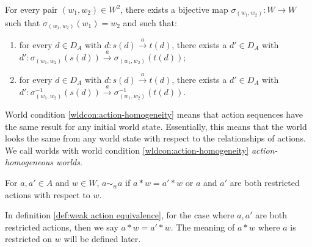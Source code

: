 \begin{world_condition}\label{wldcon:action-homogeneity}
	For every pair $(w_{1}, w_{2}) \in W^{2}$, there exists a bijective map $\sigma_{(w_{1},w_{2})}: W \to W$ such that $\sigma_{(w_{1},w_{2})}(w_{1})=w_{2}$ and such that:

	\begin{enumerate}
		\item for every $d \in D_{A}$ with $d: s(d) \xrightarrow{a} t(d)$, there exists a $d' \in D_{A}$ with $d': \sigma_{(w_{1}, w_{2})}(s(d)) \xrightarrow{a} \sigma_{(w_{1}, w_{2})}(t(d))$;

		\item for every $d \in D_{A}$ with $d: s(d) \xrightarrow{a} t(d)$, there exists a $d' \in D_{A}$ with $d': \sigma^{-1}_{(w_{1}, w_{2})}(s(d)) \xrightarrow{a} \sigma^{-1}_{(w_{1}, w_{2})}(t(d))$.
	\end{enumerate}
\end{world_condition}

World condition \ref{wldcon:action-homogeneity} means that action sequences have the same result for any initial world state.
Essentially, this means that the world looks the same from any world state with respect to the relationships of actions.
We call worlds with world condition \ref{wldcon:action-homogeneity} \textit{action-homogeneous worlds}.

\begin{definition}\label{def:weak action equivalence}
	For $a,a' \in A$ and $w \in W$, $a \sim_{w} a$ if $a * w = a' * w$ or $a$ and $a'$ are both restricted actions with respect to $w$.
\end{definition}

\begin{remark}
	In definition \ref{def:weak action equivalence}, for the case where $a, a'$ are both restricted actions, then we say $a * w = a' * w$.
	The meaning of $a * w$ where $a$ is restricted on $w$ will be defined later.
\end{remark}

